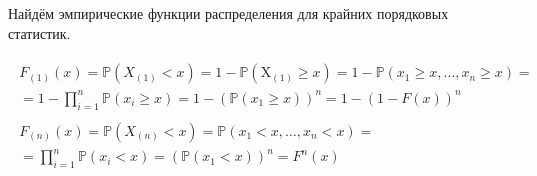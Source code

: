 \begin{exmp}
Найдём эмпирические функции распределения для крайних порядковых статистик.

\begin{gather*}
    \begin{aligned}
        F_{(1)}(x)=\mathbb{P}(X_{(1)} < x) 
    = 1 - \mathbb{P} (\mathrm{X}_{(1)} \geqslant x) 
    = 1 - \mathbb{P}(x_{1} \geqslant x, \ldots, x_{n} \geqslant x) = \\
    = 1 - \prod_{i=1}^{n} \mathbb{P}(x_{i} \geqslant x) 
    = 1 - (\mathbb{P}({x}_{1} \geqslant x))^{n} 
    = 1 - (1 - F(x))^{n} 
    \end{aligned} \\
    \begin{aligned}
        F_{(n)}(x) 
        = \mathbb{P}(X_{(n)} < x) 
        = \mathbb{P}(x_{1} < x, \ldots, x_{n} < x) = \\
        = \prod_{i=1}^{n} \mathbb{P}(x_{i} < x) 
        = (\mathbb{P}({x}_{1} < x))^{n} 
        = F^{n}(x)
    \end{aligned}
\end{gather*}
\end{exmp}

